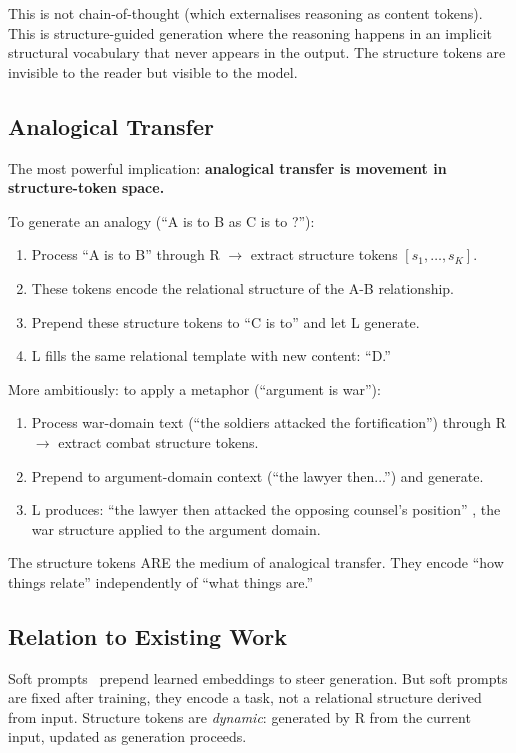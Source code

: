 \documentclass[11pt, a4paper]{article}
\theoremstyle{plain}
\theoremstyle{definition}
\theoremstyle{remark}
\begin{document}
This is not chain-of-thought (which externalises reasoning as content tokens).
This is structure-guided generation where the reasoning happens in an implicit structural vocabulary that never appears in the output.
The structure tokens are invisible to the reader but visible to the model.

\subsection{Analogical Transfer}

The most powerful implication: \textbf{analogical transfer is movement in structure-token space.}

To generate an analogy (``A is to B as C is to ?''):
\begin{enumerate}[nosep]
\item Process ``A is to B'' through R $\to$ extract structure tokens $[s_1, \ldots, s_K]$.
\item These tokens encode the relational structure of the A-B relationship.
\item Prepend these structure tokens to ``C is to'' and let L generate.
\item L fills the same relational template with new content: ``D.''
\end{enumerate}

More ambitiously: to apply a metaphor (``argument is war''):
\begin{enumerate}[nosep]
\item Process war-domain text (``the soldiers attacked the fortification'') through R $\to$ extract combat structure tokens.
\item Prepend to argument-domain context (``the lawyer then...'') and generate.
\item L produces: ``the lawyer then attacked the opposing counsel's position'' ,  the war structure applied to the argument domain.
\end{enumerate}

The structure tokens ARE the medium of analogical transfer.
They encode ``how things relate'' independently of ``what things are.''

\subsection{Relation to Existing Work}

Soft prompts~\cite{lester2021power} prepend learned embeddings to steer generation.
But soft prompts are fixed after training, they encode a task, not a relational structure derived from input.
Structure tokens are \emph{dynamic}: generated by R from the current input, updated as generation proceeds.
\end{document}
